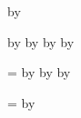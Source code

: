 \newcount\CollaboratorK
{}
\advance\CollaboratorCitations by \CollaboratorK



\newcount\TotalCitations
{}

\advance\TotalCitations by \FirstAuthorCitations
\advance\TotalCitations by \StudentAuthorCitations
\advance\TotalCitations by \CoauthorCitations
\advance\TotalCitations by \CollaboratorCitations


\newcount\FirstAuthorPublications
{}

\newcount\StudentPublications
{}

\newcount\CoauthorPublications
{}

\newcount\CollaborativePublications
{}

\newcount\AllPublications
\AllPublications=\FirstAuthorPublications
\advance\AllPublications by \StudentPublications
\advance\AllPublications by \CoauthorPublications
\advance\AllPublications by \CollaborativePublications

\newcount\AllCollaborativePublications
\AllCollaborativePublications=\CoauthorPublications
\advance\AllCollaborativePublications by \CollaborativePublications
